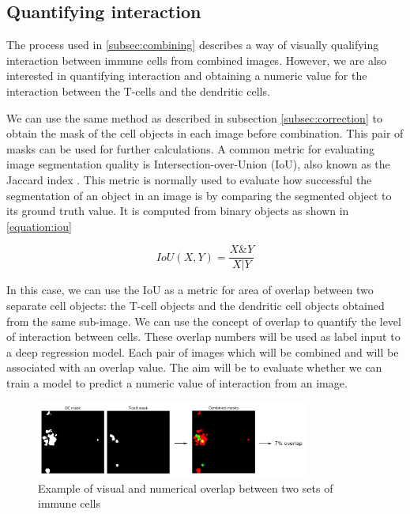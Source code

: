 \subsection{Quantifying interaction}

The process used in \autoref{subsec:combining} describes a way of visually qualifying interaction between immune cells from combined images. However, we are also interested in quantifying interaction and obtaining a numeric value for the interaction between the T-cells and the dendritic cells.

We can use the same method as described in subsection \ref{subsec:correction} to obtain the mask of the cell objects in each image before combination. This pair of masks can be used for further calculations. A common metric for evaluating image segmentation quality is Intersection-over-Union (IoU), also known as the Jaccard index \citep{rahman_optimizing_2016, rezatofighi_generalized_2019, beers_deep_2019}. This metric is normally used to evaluate how successful the segmentation of an object in an image is by comparing the segmented object to its ground truth value. It is computed from binary objects as shown in \autoref{equation:iou}

\begin{equation}
    IoU(X,Y) = \frac{X \& Y}{X | Y}
    \label{equation:iou}
\end{equation}

In this case, we can use the IoU as a metric for area of overlap between two separate cell objects: the T-cell objects and the dendritic cell objects obtained from the same sub-image. We can use the concept of overlap to quantify the level of interaction between cells. These overlap numbers will be used as label input to a deep regression model. Each pair of images which will be combined and will be associated with an overlap value. The aim will be to evaluate whether we can train a model to predict a numeric value of interaction from an image.

\begin{figure}
    \centering
    \includegraphics[width=0.8\textwidth]{dissertation/figures/mask_overlap_operation.png}
    \caption{Example of visual and numerical overlap between two sets of immune cells}
    \label{fig:mask_overlap}
\end{figure}

